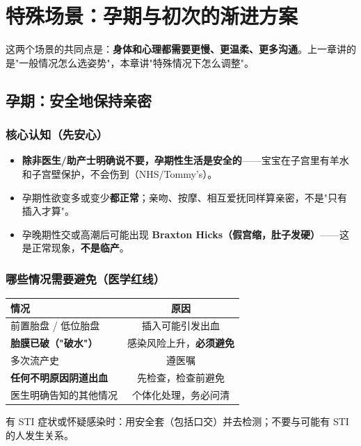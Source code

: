 \chapter{特殊场景：孕期与初次的渐进方案}

这两个场景的共同点是：\textbf{身体和心理都需要更慢、更温柔、更多沟通}。上一章讲的是"一般情况怎么选姿势"，本章讲"特殊情况下怎么调整"。

\section{孕期：安全地保持亲密}

\subsection{核心认知（先安心）}

\begin{itemize}[leftmargin=2em,itemsep=0.3em]
  \item \textbf{除非医生/助产士明确说不要，孕期性生活是安全的}——宝宝在子宫里有羊水和子宫壁保护，不会伤到（NHS/Tommy's）。
  \item 孕期性欲变多或变少\textbf{都正常}；亲吻、按摩、相互爱抚同样算亲密，不是"只有插入才算"。
  \item 孕晚期性交或高潮后可能出现 \textbf{Braxton Hicks（假宫缩，肚子发硬）}——这是正常现象，\textbf{不是临产}。
\end{itemize}

\subsection{哪些情况需要避免（医学红线）}

\begin{tabularx}{\linewidth}{X C}
\toprule
\textbf{情况} & \textbf{原因} \\
\midrule
前置胎盘 / 低位胎盘 & 插入可能引发出血 \\
\textbf{胎膜已破（"破水"）} & 感染风险上升，\textbf{必须避免} \\
多次流产史 & 遵医嘱 \\
\textbf{任何不明原因阴道出血} & 先检查，检查前避免 \\
医生明确告知的其他情况 & 个体化处理，务必问清 \\
\bottomrule
\end{tabularx}

\vspace{0.5em}
\noindent 有 STI 症状或怀疑感染时：用安全套（包括口交）并去检测；不要与可能有 STI 的人发生关系。

